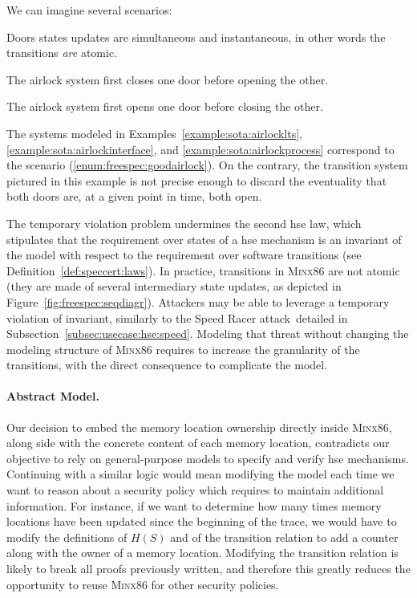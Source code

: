\begin{example}
  We can imagine several scenarios:
  \begin{inparaenum}[(1)]
  \item Doors states updates are simultaneous and instantaneous, in other words
    the transitions \emph{are} atomic.
  \item The airlock system first closes one door before opening the
    other. \label{enum:freespec:goodairlock}
  \item The airlock system first opens one door before closing the
    other. \label{enum:freespec:badairlock}
  \end{inparaenum}
  The systems modeled in Examples~\ref{example:sota:airlocklts},
  \ref{example:sota:airlockinterface}, and \ref{example:sota:airlockprocess}
  correspond to the scenario (\ref{enum:freespec:goodairlock}).
  On the contrary, the transition system pictured in this example is not precise
  enough to discard the eventuality that both doors are, at a given point in
  time, both open.
\end{example}

The temporary violation problem undermines the second \ac{hse} law, which
stipulates that the requirement over states of a \ac{hse} mechanism is an
invariant of the model with respect to the requirement over software transitions
(see Definition~\ref{def:speccert:laws}).
%
In practice, transitions in {\scshape Minx86} are not atomic (they are made of
several intermediary state updates, as depicted in
Figure~\ref{fig:freespec:seqdiagr}).
%
Attackers may be able to leverage a temporary violation of invariant, similarly
to the Speed Racer attack\,\cite{kallenberg2015racecondition} detailed in
Subsection~\ref{subsec:usecase:hse:speed}.
%
Modeling that threat without changing the modeling structure of {\scshape
  Minx86} requires to increase the granularity of the transitions, with the
direct consequence to complicate the model.

\paragraph{Abstract Model.}
%
Our decision to embed the memory location ownership directly inside {\scshape
  Minx86}, along side with the concrete content of each memory location,
contradicts our objective to rely on general-purpose models to specify and
verify \ac{hse} mechanisms.
%
Continuing with a similar logic would mean modifying the model each time we want
to reason about a security policy which requires to maintain additional
information.
%
For instance, if we want to determine how many times memory locations have been
updated since the beginning of the trace, we would have to modify the
definitions of \( H(S) \) and of the transition relation to add a counter along
with the owner of a memory location.
%
Modifying the transition relation is likely to break all proofs previously
written, and therefore this greatly reduces the opportunity to reuse {\scshape
  Minx86} for other security policies.
%

